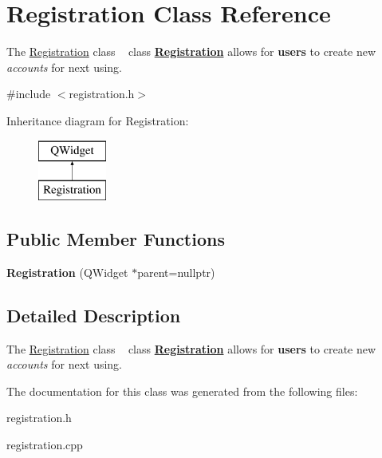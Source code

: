 \hypertarget{class_registration}{}\section{Registration Class Reference}
\label{class_registration}


The \mbox{\hyperlink{class_registration}{Registration}} class ~\newline
class {\bfseries{\mbox{\hyperlink{class_registration}{Registration}}}} allows for {\bfseries{users}} to create new {\itshape accounts} for next using.  




{\ttfamily \#include $<$registration.\+h$>$}

Inheritance diagram for Registration\+:\begin{figure}[H]
\begin{center}
\leavevmode
\includegraphics[height=2.000000cm]{class_registration}
\end{center}
\end{figure}
\subsection*{Public Member Functions}
\begin{DoxyCompactItemize}
\item 
\mbox{\label{class_registration_a2caa0ec4819473d5a6a84190414f24b9}} 
{\bfseries Registration} (Q\+Widget $\ast$parent=nullptr)
\end{DoxyCompactItemize}


\subsection{Detailed Description}
The \mbox{\hyperlink{class_registration}{Registration}} class ~\newline
class {\bfseries{\mbox{\hyperlink{class_registration}{Registration}}}} allows for {\bfseries{users}} to create new {\itshape accounts} for next using. 

The documentation for this class was generated from the following files\+:\begin{DoxyCompactItemize}
\item 
registration.\+h\item 
registration.\+cpp\end{DoxyCompactItemize}
